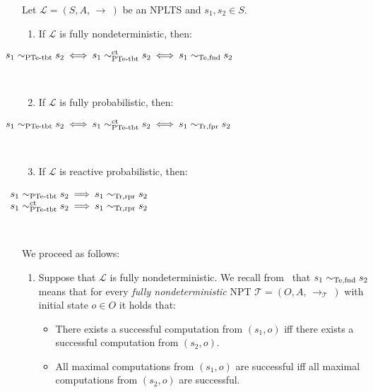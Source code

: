 \documentclass{LMCS}
\newcommand{\cws}[2]
	{\\ \centerline{$#2$} \\[-#1pt]}
\newcommand{\call}
        {\mathcal{L}}
\newcommand{\calt}
        {\mathcal{T}}
\newcommand{\arrow}[2]
        {\, {\auxarrow\limits^{#1}}_{#2} \,}
\newcommand{\auxarrow}
{\mathop{\longrightarrow}}
\newcommand{\sbis}[1]
	{\sim_{#1}}
\begin{document}
	\begin{thm}\label{thm:ptetbt_compat}

Let $\call = (S, A, \! \arrow{}{} \!)$ be an NPLTS and $s_{1}, s_{2} \in S$.

		\begin{enumerate}

\item If $\call$ is fully nondeterministic, then:
\cws{10}{\hspace*{-1.2cm} s_{1} \sbis{\textrm{\rm PTe-tbt}} s_{2} \: \Longleftrightarrow \: s_{1}
\sbis{\textrm{\rm PTe-tbt}}^{\rm ct} s_{2} \: \Longleftrightarrow \: s_{1} \sbis{\rm Te,fnd} s_{2}}

\item If $\call$ is fully probabilistic, then:
\cws{10}{\hspace*{-1.2cm} s_{1} \sbis{\textrm{\rm PTe-tbt}} s_{2} \: \Longleftrightarrow \: s_{1}
\sbis{\textrm{\rm PTe-tbt}}^{\rm ct} s_{2} \: \Longleftrightarrow \: s_{1} \sbis{\rm Tr,fpr} s_{2}}

\item If $\call$ is reactive probabilistic, then:
\cws{10}{\hspace*{-1.2cm}\begin{array}{rcl}
s_{1} \sbis{\textrm{\rm PTe-tbt}} s_{2} & \!\!\! \Longrightarrow \!\!\! & s_{1} \sbis{\rm Tr,rpr} s_{2} \\
s_{1} \sbis{\textrm{\rm PTe-tbt}}^{\rm ct} s_{2} & \!\!\! \Longrightarrow \!\!\! & s_{1} \sbis{\rm Tr,rpr}
s_{2} \\
\end{array}}

		\end{enumerate}

\proof
We proceed as follows:

		\begin{enumerate}

\item Suppose that $\call$ is fully nondeterministic. We recall from~\cite{DH84} that $s_{1} \sbis{\rm
Te,fnd} s_{2}$ means that for every \emph{fully nondeterministic} NPT $\calt = (O, A, \! \arrow{}{\calt}
\!)$ with initial state $o \in O$ it holds that:

			\begin{itemize}

\item There exists a successful computation from $(s_{1}, o)$ iff there exists a successful computation from
$(s_{2}, o)$.

\item All maximal computations from $(s_{1}, o)$ are successful iff all maximal computations from $(s_{2},
o)$ are successful.


\end{itemize}
\end{enumerate}
\end{thm}
\end{document}
